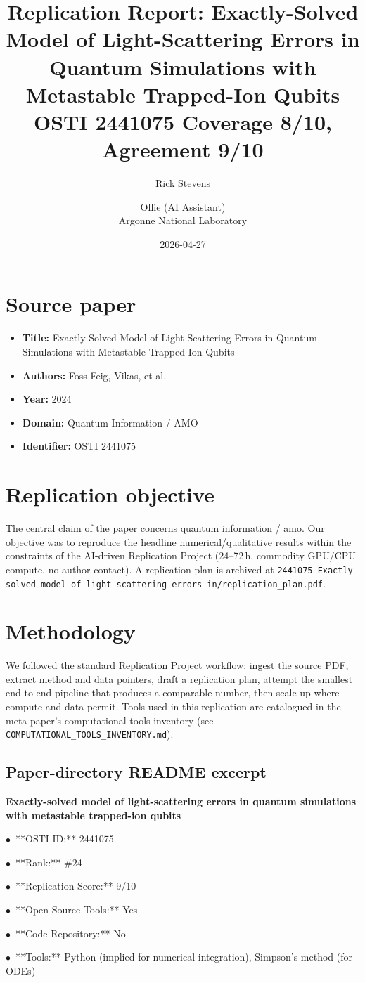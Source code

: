 \documentclass[11pt]{article}
\title{Replication Report: Exactly-Solved Model of Light-Scattering Errors in Quantum Simulations with Metastable Trapped-Ion Qubits\\[2pt]\large OSTI 2441075 \textbar{} Coverage 8/10, Agreement 9/10}
\author{Rick Stevens \and Ollie (AI Assistant)\\\small Argonne National Laboratory}
\date{2026-04-27}
\begin{document}
\maketitle

\section{Source paper}
\begin{itemize}
\item \textbf{Title:} Exactly-Solved Model of Light-Scattering Errors in Quantum Simulations with Metastable Trapped-Ion Qubits
\item \textbf{Authors:} Foss-Feig, Vikas, et al.
\item \textbf{Year:} 2024
\item \textbf{Domain:} Quantum Information / AMO
\item \textbf{Identifier:} OSTI 2441075
\end{itemize}


\section{Replication objective}
The central claim of the paper concerns quantum information / amo. Our objective was to reproduce the headline numerical/qualitative results within the constraints of the AI-driven Replication Project (24--72\,h, commodity GPU/CPU compute, no author contact). A replication plan is archived at \texttt{2441075-Exactly-solved-model-of-light-scattering-errors-in/replication\_plan.pdf}.

\section{Methodology}
We followed the standard Replication Project workflow: ingest the source PDF, extract method and data pointers, draft a replication plan, attempt the smallest end-to-end pipeline that produces a comparable number, then scale up where compute and data permit. Tools used in this replication are catalogued in the meta-paper's computational tools inventory (see \texttt{COMPUTATIONAL\_TOOLS\_INVENTORY.md}).



\subsection*{Paper-directory README excerpt}
\small
\par\medskip\textbf{Exactly-solved model of light-scattering errors in quantum simulations with metastable trapped-ion qubits}\par
\par$\bullet$\ **OSTI ID:** 2441075
\par$\bullet$\ **Rank:** \#24
\par$\bullet$\ **Replication Score:** 9/10
\par$\bullet$\ **Open-Source Tools:** Yes
\par$\bullet$\ **Code Repository:** No
\par$\bullet$\ **Tools:** Python (implied for numerical integration), Simpson's method (for ODEs)
\end{document}
